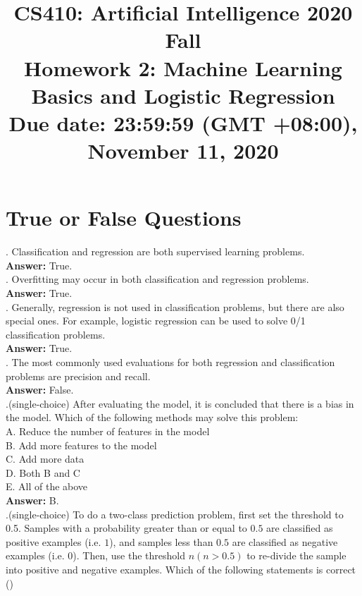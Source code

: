 \documentclass{article}
\title{\normalsize
CS410: Artificial Intelligence 2020 Fall\\
Homework 2: Machine Learning Basics and Logistic Regression\\
Due date: 23:59:59 (GMT +08:00), November 11, 2020}
\author{}
\date{}
\begin{document}
 
\maketitle

\section{True or False Questions}
. Classification and regression are both supervised learning problems. \\

\textbf{Answer:} True. \\

. Overfitting may occur in both classification and regression problems. \\

\textbf{Answer:} True. \\

. Generally, regression is not used in classification problems, but there are also special ones. For example, logistic regression can be used to solve 0/1 classification problems. \\

\textbf{Answer:} True. \\

. The most commonly used evaluations for both regression and classification problems are precision and recall.  \\

\textbf{Answer:} False. \\

.(single-choice) After evaluating the model, it is concluded that there is a bias in the model. Which of the following methods may solve this problem:\\
    A. Reduce the number of features in the model\\
    B. Add more features to the model\\
    C. Add more data\\
    D. Both B and C\\
    E. All of the above\\

\textbf{Answer:} B. \\

.(single-choice) To do a two-class prediction problem, first set the threshold to 0.5. Samples with a probability greater than or equal to $0.5$ are classified as positive examples (i.e. $1$), and samples less than $0.5$ are classified as negative examples (i.e. $0$). Then, use the threshold $n (n>0.5)$ to re-divide the sample into positive and negative examples. Which of the following statements is correct () \\
\end{document}
